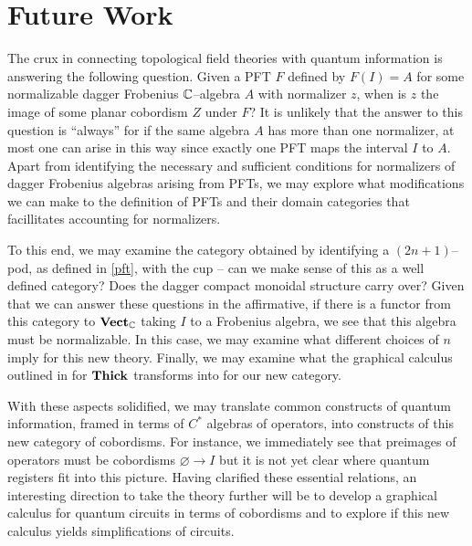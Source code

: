 
\pagebreak

\section{Future Work}

The crux in connecting topological field theories with quantum information is
answering the following question. Given a PFT $F$ defined by $F(I) = A$ for some
normalizable dagger Frobenius $\mathbb{C}$--algebra $A$ with normalizer $z$, when is $z$
the image of some planar cobordism $Z$ under $F$? It is unlikely that the answer
to this question is ``always'' for if the same algebra $A$ has more than one
normalizer, at most one can arise in this way since exactly one PFT maps the
interval $I$ to $A$. Apart from identifying the necessary and sufficient
conditions for normalizers of dagger Frobenius algebras arising from PFTs, we
may explore what modifications we can make to the definition of PFTs and their
domain categories that facillitates accounting for normalizers.

To this end, we may examine the category obtained by identifying a $(2n +
1)$--pod, as defined in \ref{pft}, with the cup -- can we make sense of this as
a well defined category?  Does the dagger compact monoidal structure carry over?
Given that we can answer these questions in the affirmative, if there is a
functor from this category to $\textbf{Vect}_{\mathbb{C}}$ taking $I$ to a Frobenius algebra, we
see that this algebra must be normalizable. In this case, we may examine what
different choices of $n$ imply for this new theory. Finally, we may examine what
the graphical calculus outlined in \cite{NonCommTQFT} for $\textbf{Thick}$ transforms
into for our new category.

With these aspects solidified, we may translate common constructs of quantum
information, framed in terms of $C^*$ algebras of operators, into constructs of
this new category of cobordisms. For instance, we immediately see that preimages
of operators must be cobordisms $\varnothing \to I$ but it is not yet clear
where quantum registers fit into this picture. Having clarified these essential
relations, an interesting direction to take the theory further will be to
develop a graphical calculus for quantum circuits in terms of cobordisms and to
explore if this new calculus yields simplifications of circuits.

